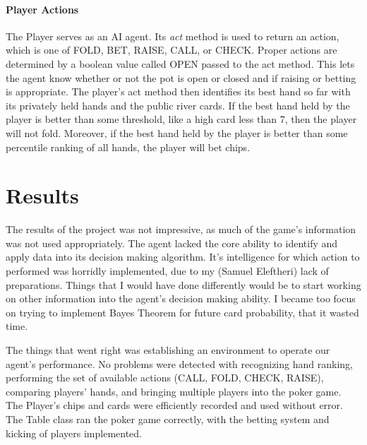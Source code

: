 \documentclass[10pt, a4paper, twocolumn]{article} %
\newcommand*\Hs[1]{\ensuremath{{\color{blue} #1}{\color{red}\varheartsuit}}}
\newcommand*\Cs[1]{\ensuremath{{\color{blue} #1}{\color{black}\clubsuit}}}
\begin{document}
\paragraph{Player Actions}
The Player serves as an AI agent. Its \textit{act} method is used to return an action, which is one of FOLD, BET, RAISE, CALL, or CHECK. Proper actions are determined by a boolean value called OPEN passed to the act method. This lets the agent know whether or not the pot is open or closed and if raising or betting is appropriate. The player's act method then identifies its best hand so far with its privately held hands and the public river cards. If the best hand held by the player is better than some threshold, like a high card less than 7, then the player will not fold. Moreover, if the best hand held by the player is better than some percentile ranking of all hands, the player will bet chips.




\section{Results}

The results of the project was not impressive, as much of the game's information was not used appropriately. The agent lacked the core ability to identify and apply data into its decision making algorithm. It's intelligence for which action to performed was horridly implemented, due to my (Samuel Eleftheri) lack of preparations. Things that I would have done differently would be to start working on other information into the agent's decision making ability. I became too focus on trying to implement Bayes Theorem for future card probability, that it wasted time.

The things that went right was establishing an environment to operate our agent's performance. No problems were detected with recognizing hand ranking, performing the set of available actions (CALL, FOLD, CHECK, RAISE), comparing players' hands, and bringing multiple players into the poker game. The Player's chips and cards were efficiently recorded and used without error. The Table class ran the poker game correctly, with the betting system and kicking of players implemented. \\ \\ \\ \\ \\
\end{document}

